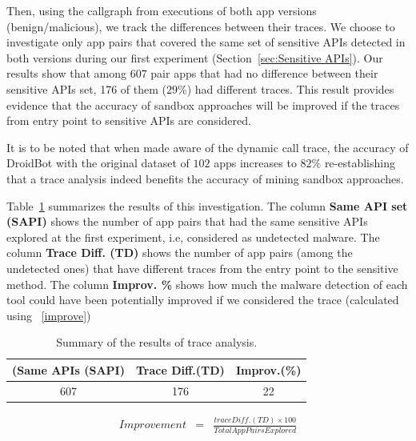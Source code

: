Then, using the callgraph from executions of both app versions (benign/malicious), we track the differences between their traces. We choose to investigate only app pairs that covered the same set of sensitive APIs detected in both versions during our first experiment (Section~\ref{sec:Sensitive APIs}). Our results show that among $607$ pair apps that had no difference between their sensitive APIs set, 176 of them ($29$\%) had different traces. This result provides evidence that the accuracy of sandbox approaches will be improved if the traces from entry point to sensitive APIs are considered.

It is to be noted that when made aware of the dynamic call trace, the accuracy of DroidBot with the original dataset of $102$ apps increases to $82\%$ re-establishing that a trace analysis indeed benefits the accuracy of mining sandbox approaches. 

Table~\ref{tab:pa} summarizes the results of this investigation. The column \textbf{Same API set (SAPI)} shows the number of app pairs that had the same sensitive APIs explored at the first experiment, i.e, considered as undetected malware. The column \textbf{Trace Diff. (TD)} shows the number of app pairs (among the undetected ones) that have different traces from the entry point to the sensitive method. The column \textbf{Improv. \%} shows how much the malware detection of each tool could have been potentially improved if we considered the trace (calculated using ~\eqref{improve})

\begin{table}[ht!]
  \caption{Summary of the results of trace analysis. }
  \centering
  \begin{small}
 \begin{tabular}{ccc}
   \toprule
   (Same APIs (SAPI) & Trace Diff.(TD) & Improv.(\%) \\   \midrule
   607 & 176 & 22 \\
 \bottomrule
 \end{tabular}
 \end{small}
 \label{tab:pa}
\end{table}



\begin{eqnarray}
Improvement & = & \frac{trace Diff. (TD) \times 100}{Total App Pairs Explored} 
\label{improve}
\end{eqnarray}


